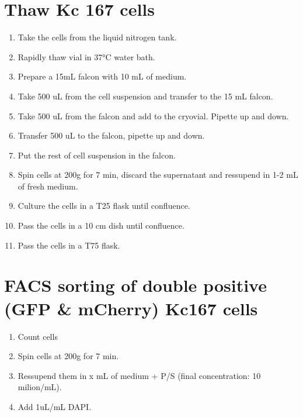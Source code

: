 \documentclass[11pt]{article}
\begin{document}
\section{Thaw Kc 167 cells}
\label{sec:org23ae3bc}
\begin{enumerate}
\item Take the cells from the liquid nitrogen tank.\\
\item Rapidly thaw vial in 37°C water bath.\\
\item Prepare a 15mL falcon with 10 mL of medium.\\
\item Take 500 uL from the cell suspension and transfer to the 15 mL falcon.\\
\item Take 500 uL from the falcon and add to the cryovial. Pipette up and down.\\
\item Transfer 500 uL to the falcon, pipette up and down.\\
\item Put the rest of cell suspension in the falcon.\\
\item Spin cells at 200g for 7 min, discard the supernatant and ressupend in 1-2 mL of fresh medium.\\
\item Culture the cells in a T25 flask until confluence.\\
\item Pass the cells in a 10 cm dish until confluence.\\
\item Pass the cells in a T75 flask.\\
\end{enumerate}
\section{FACS sorting of double positive (GFP \& mCherry) Kc167 cells}
\label{sec:orgaa91c0a}
\begin{enumerate}
\item Count cells\\
\item Spin cells at 200g for 7 min.\\
\item Ressupend them in x mL of medium + P/S (final concentration: 10 milion/mL).\\
\item Add 1uL/mL DAPI.\\
\end{enumerate}
\end{document}
